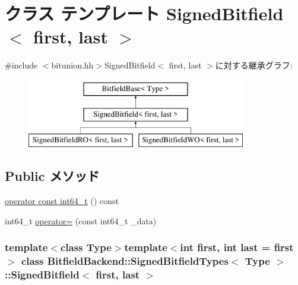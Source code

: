 \hypertarget{classBitfieldBackend_1_1SignedBitfieldTypes_1_1SignedBitfield}{
\section{クラス テンプレート SignedBitfield$<$ first, last $>$}
\label{classBitfieldBackend_1_1SignedBitfieldTypes_1_1SignedBitfield}
}


{\ttfamily \#include $<$bitunion.hh$>$}SignedBitfield$<$ first, last $>$に対する継承グラフ:\begin{figure}[H]
\begin{center}
\leavevmode
\includegraphics[height=3cm]{classBitfieldBackend_1_1SignedBitfieldTypes_1_1SignedBitfield}
\end{center}
\end{figure}
\subsection*{Public メソッド}
\begin{DoxyCompactItemize}
\item 
\hyperlink{classBitfieldBackend_1_1SignedBitfieldTypes_1_1SignedBitfield_a44fb8a8077f66f5a72d1c16acfc80f9c}{operator const int64\_\-t} () const 
\item 
int64\_\-t \hyperlink{classBitfieldBackend_1_1SignedBitfieldTypes_1_1SignedBitfield_aa9c1202c4f5162c5214e708c80d5d4c8}{operator=} (const int64\_\-t \_\-data)
\end{DoxyCompactItemize}
\subsubsection*{template$<$class Type$>$template$<$int first, int last = first$>$ class BitfieldBackend::SignedBitfieldTypes$<$ Type $>$::SignedBitfield$<$ first, last $>$}



